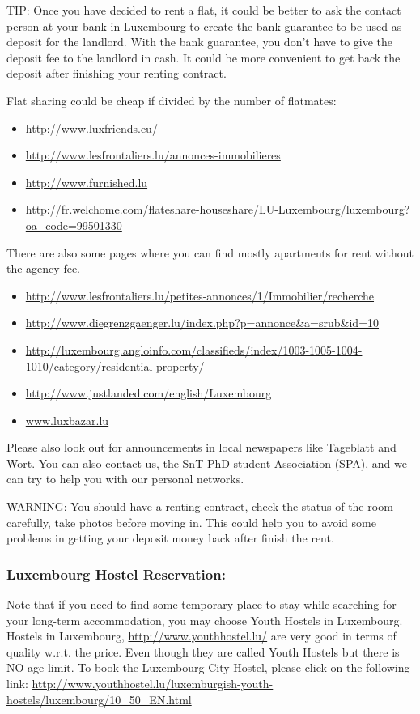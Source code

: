 TIP: Once you have decided to rent a flat, it could be better to ask the contact person at your bank in Luxembourg to create the bank guarantee to be used as deposit for the landlord. 
With the bank guarantee, you don't have to give the deposit fee to the landlord in cash. 
It could be more convenient to get back the deposit after finishing your renting contract. 

Flat sharing could be cheap if divided by the number of flatmates:
\begin{itemize}
\item \url{http://www.luxfriends.eu/}
\item \url{http://www.lesfrontaliers.lu/annonces-immobilieres}
\item \url{http://www.furnished.lu} 
\item \url{http://fr.welchome.com/flateshare-houseshare/LU-Luxembourg/luxembourg?oa_code=99501330} 
\end{itemize}

There are also some pages where you can find mostly apartments for rent without the agency fee.
\begin{itemize}
	\item \url{http://www.lesfrontaliers.lu/petites-annonces/1/Immobilier/recherche}
	\item \url{http://www.diegrenzgaenger.lu/index.php?p=annonce&a=srub&id=10}
	\item \url{http://luxembourg.angloinfo.com/classifieds/index/1003-1005-1004-1010/category/residential-property/}
	\item \url{http://www.justlanded.com/english/Luxembourg}
	\item \url{www.luxbazar.lu}
\end{itemize}

Please also look out for announcements in local newspapers like Tageblatt and Wort.
You can also contact us, the SnT PhD student Association (SPA), and we can try to help you with our personal networks. 

WARNING: You should have a renting contract, check the status of the room carefully, take photos before moving in. 
This could help you to avoid some problems in getting your deposit money back after finish the rent. 

\subsubsection{Luxembourg Hostel Reservation:} Note that if you need to find some temporary place to stay while searching for your long-term accommodation, you may choose Youth Hostels in Luxembourg. Hostels in Luxembourg, \url{http://www.youthhostel.lu/} are very good in terms of quality w.r.t. the price. Even though they are called Youth Hostels but there is NO age limit.
To book the Luxembourg City-Hostel, please click on the following link: \url{http://www.youthhostel.lu/luxemburgish-youth-hostels/luxembourg/10_50_EN.html}

